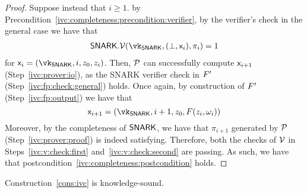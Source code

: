 \begin{proof}
 
 Suppose instead that $i \geq 1$.
 by Precondition~\ref{ivc:completeness:precondition:verifier},
 by the verifier's check in the general case 
 we have that
 \begin{align*}
   \snark.\V(\vk_\snark, (\bot, \io_i), \pi_i) = 1
 \end{align*}
 for $\io_i = (\vk_\snark, i, z_0, z_i)$.
 Then,
 $\mathcal{P}$ can successfully compute $\mathsf{x}_{i + 1}$ 
 (Step~\ref{ivc:prover:io}),
 as the SNARK verifier check in $F'$
 (Step~\ref{ivc:fp:check:general})
 holds.
 Once again,
 by construction of $F'$
 (Step~\ref{ivc:fp:output})
 we have that 
 \[
   \io_{i + 1} = (\vk_{\snark}, i + 1, z_0, F(z_i, \omega_i))
 \]
 Moreover,
 by the completeness
 of $\mathsf{SNARK}$,
 we have that $\pi_{i + 1}$ generated by $\mathcal{P}$ 
 (Step~\ref{ivc:prover:proof})
 is indeed satisfying.
 Therefore, 
 both the checks of $\mathcal{V}$ in Steps~\ref{ivc:v:check:first} and~\ref{ivc:v:check:second}
 are passing.
 As such,
 we have that postcondition~\ref{ivc:completeness:postcondition}
 holds.
\end{proof}

\begin{lemma}
 Construction~\ref{cons:ivc}
 is knowledge-sound.
\end{lemma}


